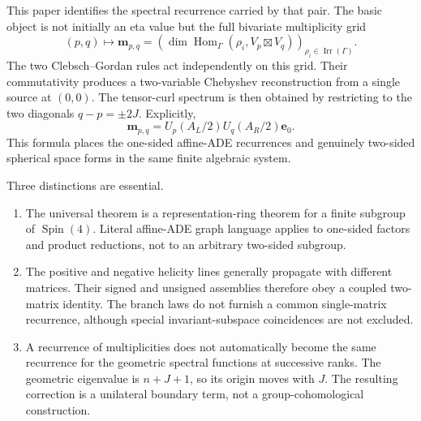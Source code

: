 \documentclass[11pt]{article}
\theoremstyle{definition}
\DeclareMathOperator{\Hom}{Hom}
\DeclareMathOperator{\Irr}{Irr}
\begin{document}
This paper identifies the spectral recurrence carried by that pair.  The
basic object is not initially an eta value but the full bivariate
multiplicity grid
\[
 (p,q)\longmapsto
 \boldsymbol m_{p,q}
 =
 \left(
 \dim\Hom_\Gamma(\rho_i,V_p\boxtimes V_q)
 \right)_{\rho_i\in\Irr(\Gamma)} .
\]
The two Clebsch--Gordan rules act independently on this grid.  Their
commutativity produces a two-variable Chebyshev reconstruction from a
single source at $(0,0)$.  The tensor-curl spectrum is then obtained by
restricting to the two diagonals $q-p=\pm2J$.
Explicitly,
\[
 \boldsymbol m_{p,q}
 =U_p(A_L/2)U_q(A_R/2)\boldsymbol e_0 .
\]
This formula places the one-sided affine-ADE recurrences and genuinely
two-sided spherical space forms in the same finite algebraic system.

Three distinctions are essential.

\begin{enumerate}[label=(\roman*)]
\item The universal theorem is a representation-ring theorem for a finite
subgroup of $\operatorname{Spin}(4)$.  Literal affine-ADE graph language
applies to one-sided factors and product reductions, not to an arbitrary
two-sided subgroup.
\item The positive and negative helicity lines generally propagate with
different matrices.  Their signed and unsigned assemblies therefore obey
a coupled two-matrix identity.  The branch laws do not furnish a common
single-matrix recurrence, although special invariant-subspace
coincidences are not excluded.
\item A recurrence of multiplicities does not automatically become the
same recurrence for the geometric spectral functions at successive ranks.
The geometric eigenvalue is $n+J+1$, so its origin moves with $J$.  The
resulting correction is a unilateral boundary term, not a
group-cohomological construction.
\end{enumerate}
\end{document}
